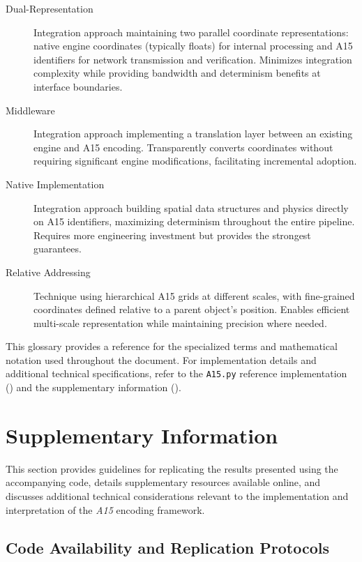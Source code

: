 \documentclass[10pt]{article}
\def\AAAB{\textit{A15}}
\begin{document}
\begin{description}
    \item[Dual-Representation] Integration approach maintaining two parallel coordinate representations: native engine coordinates (typically floats) for internal processing and A15 identifiers for network transmission and verification. Minimizes integration complexity while providing bandwidth and determinism benefits at interface boundaries.

    \item[Middleware] Integration approach implementing a translation layer between an existing engine and A15 encoding. Transparently converts coordinates without requiring significant engine modifications, facilitating incremental adoption.

    \item[Native Implementation] Integration approach building spatial data structures and physics directly on A15 identifiers, maximizing determinism throughout the entire pipeline. Requires more engineering investment but provides the strongest guarantees.

    \item[Relative Addressing] Technique using hierarchical A15 grids at different scales, with fine-grained coordinates defined relative to a parent object's position. Enables efficient multi-scale representation while maintaining precision where needed.
\end{description}

This glossary provides a reference for the specialized terms and mathematical notation used throughout the document. For implementation details and additional technical specifications, refer to the \texttt{A15.py} reference implementation () and the supplementary information ().

\section{Supplementary Information}\label{sec-supplementary}

This section provides guidelines for replicating the results presented using the accompanying code, details supplementary resources available online, and discusses additional technical considerations relevant to the implementation and interpretation of the \AAAB{} encoding framework.

\subsection{Code Availability and Replication Protocols}\label{subsec-replication}
\end{document}
